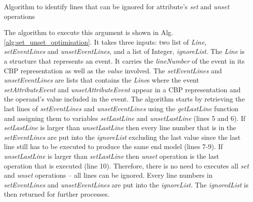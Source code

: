 \documentclass[sigconf]{acmart}
\begin{document}
\begin{algorithm}
\caption{Algorithm to identify lines that can be ignored for attribute's \emph{set} and \emph{unset} operations}
\label{alg:set_unset_optimisation}
\end{algorithm}

The algorithm to execute this argument is shown in Alg. \ref{alg:set_unset_optimisation}. It takes three inputs: two list of \emph{Line}, \emph{setEventLines} and \emph{unsetEventLines}, and a list of Integer, \emph{ignoreList}. The \emph{Line} is a structure that represents an event. It carries the \emph{lineNumber} of the event in its CBP representation as well as the \emph{value} involved. The \emph{setEventLines} and \emph{unsetEventLines} are lists that contains the \emph{Line}s where the event \emph{setAttributeEvent} and \emph{unsetAttributeEvent} appear in a CBP representation and the operand's value included in the event. The algorithm starts by retrieving the last lines of \emph{setEventLines} and \emph{unsetEventLines} using the \emph{getLastLine} function and assigning them to variables \emph{setLastLine} and \emph{unsetLastLine} (lines 5 and 6). If \emph{setLastLine} is larger than \emph{unsetLastLine} then every line number that is in the \emph{setEventLines} are put into the \emph{ignoreList} excluding the last value since the last line still has to be executed to produce the same end model (lines 7-9). If \emph{unsetLastLine} is larger than \emph{setLastLine} then \emph{unset} operation is the last operation that is executed (line 10). Therefore, there is no need to executes all \emph{set} and \emph{unset} operations -- all lines can be ignored. Every line numbers in \emph{setEventLines} and \emph{unsetEventLines} are put into the \emph{ignoreList}. The \emph{ignoredList} is then returned for further processes.
\end{document}
